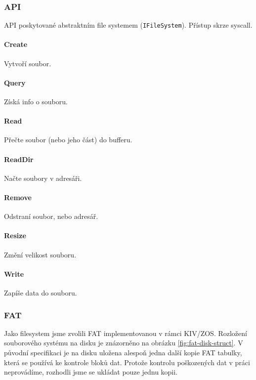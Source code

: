 \documentclass[11pt,a4paper]{scrartcl}
\begin{document}
	\subsubsection{API}
	API poskytované abstraktním file systemem (\verb|IFileSystem|). Přístup skrze syscall.
	
	\paragraph{Create}
	Vytvoří soubor.
	
	\paragraph{Query}
	Získá info o souboru.
	
	\paragraph{Read}
	Přečte soubor (nebo jeho část) do bufferu.
	
	\paragraph{ReadDir}
	Načte soubory v adresáři.
	
	\paragraph{Remove}
	Odstraní soubor, nebo adresář.
	
	\paragraph{Resize}
	Změní velikost souboru.
	
	\paragraph{Write}
	Zapíše data do souboru.
	
	\subsubsection{FAT}
	
	Jako filesystem jsme zvolili FAT implementovanou v rámci KIV/ZOS. Rozložení souborového systému na disku je znázorněno na obrázku \ref{fig:fat-disk-struct}. V původní specifikaci je na disku uložena alespoň jedna další kopie FAT tabulky, která se používá ke kontrole bloků dat. Protože kontrolu poškozených dat v práci neprovádíme, rozhodli jsme se ukládat pouze jednu kopii.
	
\end{document}
